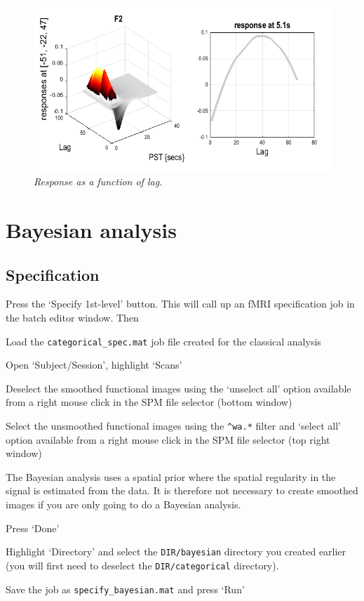 \begin{figure}
\begin{center}
\includegraphics[width=150mm]{faces/famous_lag}
\caption{\em Response as a function of lag. \label{famous_lag} }
\end{center}
\end{figure}


\section{Bayesian analysis}


\subsection{Specification}

Press the `Specify 1st-level' button. This will call up an fMRI specification job in the batch editor window. Then

\bi
\item{Load the \verb!categorical_spec.mat! job file created for the 
classical analysis}
\item{Open `Subject/Session', highlight `Scans'} \item{Deselect the smoothed functional images using the `unselect all' option available from a right mouse click in the SPM file selector (bottom window)}
\item{Select the 
unsmoothed functional images using the \verb!^wa.*! filter and `select all' option available from a right mouse click in the SPM file selector (top right window)

The Bayesian analysis uses a spatial prior where the spatial regularity in the signal is estimated from the data. It is therefore not necessary to create smoothed images if you are only going to do a Bayesian analysis.}
\item{Press `Done'}
\item{Highlight `Directory' and select the 
\verb!DIR/bayesian! directory you created earlier (you will first need to deselect the \verb!DIR/categorical! directory).}
\item{Save the job as \verb!specify_bayesian.mat! and press `Run'}
\ei

